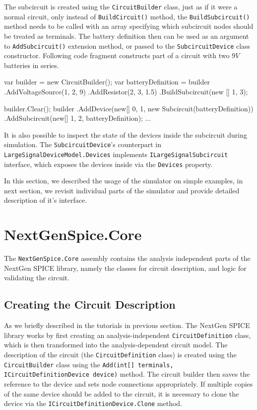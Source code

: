 The subcircuit is created using the \texttt{CircuitBuilder} class, just as if it were a normal circuit, only instead of \texttt{BuildCircuit()} method, the \texttt{BuildSubcircuit()} method needs to be called with an array specifying which subcircuit nodes should be treated as terminals. The battery definition then can be used as an argument to \texttt{AddSubcircuit()} extension method, or passed to the \texttt{SubcircuitDevice} class constructor. Following code fragment constructs part of a circuit with two $9V$ batteries in series.

\begin{csharpcode}
var builder = new CircuitBuilder();
var batteryDefinition = builder
	.AddVoltageSource(1, 2, 9)
	.AddResistor(2, 3, 1.5)
	.BuildSubcircuit(new [] {1, 3});

builder.Clear();
builder
	.AddDevice(new[] {0, 1}, new Subcircuit(batteryDefinition))
	.AddSubcircuit(new[] {1, 2}, batteryDefinition);
	...
\end{csharpcode}


It is also possible to inspect the state of the devices inside the subcircuit during simulation. The \texttt{SubcircuitDevice}'s counterpart in \texttt{LargeSignalDeviceModel\+.Devices} implements \texttt{ILargeSignalSubcircuit} interface, which exposes the devices inside via the \texttt{Devices} property.

In this section, we described the usage of the simulator on simple examples, in next section, we revisit individual parts of the simulator and provide detailed description of it's interface.

\section{NextGenSpice.Core}

The \texttt{NextGenSpice.Core} assembly contains the analysis independent parts of the NextGen SPICE library, namely the classes for circuit description, and logic for validating the circuit.

\subsection{Creating the Circuit Description}
As we briefly described in the tutorials in previous section. The NextGen SPICE library works by first creating an analysis-independent \texttt{CircuitDefinition} class, which is then transformed into the analysis-dependent circuit model. The description of the circuit (the \texttt{CircuitDefinition} class) is created using the \texttt{Circuit\+Builder} class using the \texttt{Add(int[] terminals, ICircuitDefinitionDevice device)} method. The circuit builder then saves the reference to the device and sets node connections appropriately. If multiple copies of the same device should be added to the circuit, it is necessary to clone the device via the \texttt{ICircuitDefinitionDevice.Clone} method.

